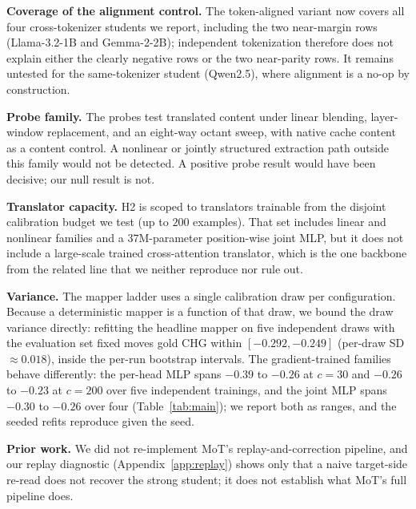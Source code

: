 \documentclass{article} %
\begin{document}
\textbf{Coverage of the alignment control.} The token-aligned variant now covers
all four cross-tokenizer students we report, including the two near-margin rows
(Llama-3.2-1B and Gemma-2-2B); independent tokenization therefore does not
explain either the clearly negative rows or the two near-parity rows. It remains
untested for the same-tokenizer student (Qwen2.5), where alignment is a no-op by
construction.

\textbf{Probe family.} The probes test translated content under linear
blending, layer-window replacement, and an eight-way octant sweep, with native
cache content as a content control. A nonlinear or jointly structured
extraction path outside this family would not be detected. A positive probe
result would have been decisive; our null result is not.

\textbf{Translator capacity.} H2 is scoped to translators trainable from the
disjoint calibration budget we test (up to $200$ examples). That set includes
linear and nonlinear families and a $37$M-parameter position-wise joint MLP,
but it does not
include a large-scale trained cross-attention translator, which is the one
backbone from the related line that we neither reproduce nor rule out.

\textbf{Variance.} The mapper ladder uses a single calibration draw per
configuration. Because a deterministic mapper is a function of that draw, we
bound the draw variance directly: refitting the headline mapper on five
independent draws with the evaluation set fixed moves gold CHG within
$[-0.292, -0.249]$ (per-draw SD $\approx 0.018$), inside the per-run bootstrap
intervals. The gradient-trained families behave differently: the per-head MLP
spans $-0.39$ to $-0.26$ at $c{=}30$ and $-0.26$ to $-0.23$ at $c{=}200$ over
five independent trainings, and the joint MLP spans $-0.30$ to $-0.26$ over
four (Table~\ref{tab:main}); we report both as ranges, and the seeded refits
reproduce given the seed.

\textbf{Prior work.} We did not re-implement MoT's replay-and-correction
pipeline, and our replay diagnostic (Appendix~\ref{app:replay}) shows only that
a naive target-side re-read does not recover the strong student; it does not
establish what MoT's full pipeline does.
\end{document}
